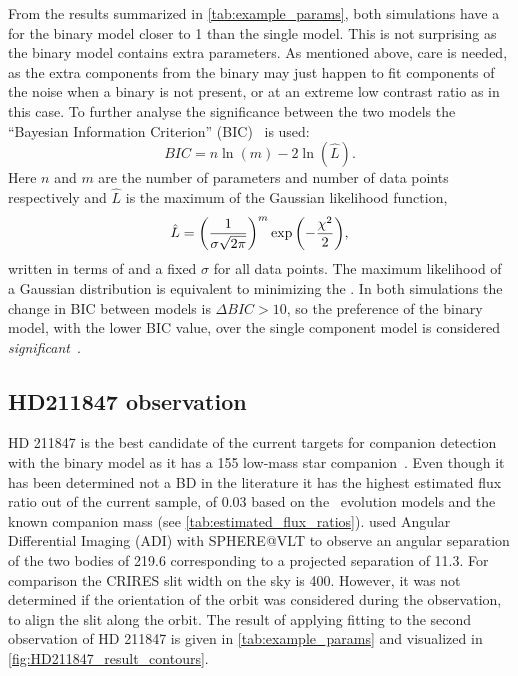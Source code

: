 From the results summarized in \cref{tab:example_params}, both simulations have a \textchisquaredreduced{} for the binary model closer to 1 than the single model.
This is not surprising as the binary model contains extra parameters.
As mentioned above, care is needed, as the extra components from the binary may just happen to fit components of the noise when a binary is not present, or at an extreme low contrast ratio as in this case.
To further analyse the significance between the two models the ``Bayesian Information Criterion'' ({BIC})~\citep{schwarz_estimating_1978} is used:
\begin{equation}
{BIC} = n\ln{(m)} - 2\ln{(\hat{L})}.
\end{equation}
Here \(n\) and \(m\) are the number of parameters and number of data points respectively and \(\hat{L}\) is the maximum of the Gaussian likelihood function, 
\begin{equation}
\hat{L} = {\left(\frac{1}{\sigma \sqrt{2\pi}}\right)}^{m} \exp{\left(-\frac{{\chi}^{2}}{2}\right)},
\end{equation}
written in terms of \textchisquared{} and a fixed \(\sigma\) for all data points.
The maximum likelihood of a Gaussian distribution is equivalent to minimizing the \textchisquared{}.
In both simulations the change in {BIC} between models is \(\Delta {BIC} >10\), so the preference of the binary model, with the lower {BIC} value, over the single component model is considered \emph{significant}~\citep{kass_bayes_1995}.

\subsection{HD211847 observation}
\label{subsec:results-hd211847}
{HD 211847} is the best candidate of the current targets for companion detection with the \textchisquared{} binary model as it has a 155\Mjup{} low-mass star companion~\citet{moutou_eccentricity_2017}.
Even though it has been determined not a {BD} in the literature it has the highest estimated flux ratio out of the current sample, of 0.03 based on the~\citet{baraffe_new_2015} evolution models and the known companion mass (see \cref{tab:estimated_flux_ratios}).
\citet{moutou_eccentricity_2017} used Angular Differential Imaging ({ADI}) with {SPHERE@VLT} to observe an angular separation of the two bodies of 219.6\mas{} corresponding to a projected separation of 11.3\AU{}.
For comparison the {CRIRES} slit width on the sky is 400\mas.
However, it was not determined if the orientation of the orbit was considered during the observation, to align the slit along the orbit.
The result of applying \textchisquared{} fitting to the second observation of {HD 211847} is given in \cref{tab:example_params} and visualized in \cref{fig:HD211847_result_contours}.

